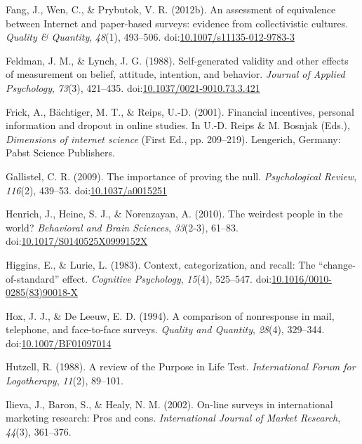 \documentclass[english,man]{apa6}
\theoremstyle{definition}
\theoremstyle{definition}
\theoremstyle{definition}
\theoremstyle{remark}
\begin{document}
\hypertarget{ref-Fang2012}{}
Fang, J., Wen, C., \& Prybutok, V. R. (2012b). An assessment of
equivalence between Internet and paper-based surveys: evidence from
collectivistic cultures. \emph{Quality \& Quantity}, \emph{48}(1),
493--506.
doi:\href{https://doi.org/10.1007/s11135-012-9783-3}{10.1007/s11135-012-9783-3}

\hypertarget{ref-Feldman1988}{}
Feldman, J. M., \& Lynch, J. G. (1988). Self-generated validity and
other effects of measurement on belief, attitude, intention, and
behavior. \emph{Journal of Applied Psychology}, \emph{73}(3), 421--435.
doi:\href{https://doi.org/10.1037/0021-9010.73.3.421}{10.1037/0021-9010.73.3.421}

\hypertarget{ref-Frick2001}{}
Frick, A., Bächtiger, M. T., \& Reips, U.-D. (2001). Financial
incentives, personal information and dropout in online studies. In U.-D.
Reips \& M. Bosnjak (Eds.), \emph{Dimensions of internet science} (First
Ed., pp. 209--219). Lengerich, Germany: Pabst Science Publishers.

\hypertarget{ref-Gallistel2009}{}
Gallistel, C. R. (2009). The importance of proving the null.
\emph{Psychological Review}, \emph{116}(2), 439--53.
doi:\href{https://doi.org/10.1037/a0015251}{10.1037/a0015251}

\hypertarget{ref-Henrich2010}{}
Henrich, J., Heine, S. J., \& Norenzayan, A. (2010). The weirdest people
in the world? \emph{Behavioral and Brain Sciences}, \emph{33}(2-3),
61--83.
doi:\href{https://doi.org/10.1017/S0140525X0999152X}{10.1017/S0140525X0999152X}

\hypertarget{ref-Higgins1983}{}
Higgins, E., \& Lurie, L. (1983). Context, categorization, and recall:
The ``change-of-standard'' effect. \emph{Cognitive Psychology},
\emph{15}(4), 525--547.
doi:\href{https://doi.org/10.1016/0010-0285(83)90018-X}{10.1016/0010-0285(83)90018-X}

\hypertarget{ref-Hox1994}{}
Hox, J. J., \& De Leeuw, E. D. (1994). A comparison of nonresponse in
mail, telephone, and face-to-face surveys. \emph{Quality and Quantity},
\emph{28}(4), 329--344.
doi:\href{https://doi.org/10.1007/BF01097014}{10.1007/BF01097014}

\hypertarget{ref-Hutzell1988}{}
Hutzell, R. (1988). A review of the Purpose in Life Test.
\emph{International Forum for Logotherapy}, \emph{11}(2), 89--101.

\hypertarget{ref-Ilieva2001}{}
Ilieva, J., Baron, S., \& Healy, N. M. (2002). On-line surveys in
international marketing research: Pros and cons. \emph{International
Journal of Market Research}, \emph{44}(3), 361--376.
\end{document}
